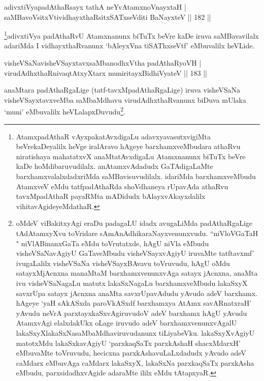 
\begin{shl}
adivxtiVyapadAthaRsayx tathA neYvA\s \s tamxnoV\s nayxtaH |\\
saMBavoV\s sitxVtividhayxthaRsitxSATxseVditi BaNayxteV \hfill || 182 ||
\end{shl}

\begin{artha}
\footnote[2]{AtamxpadAthaR vAyxpakatAvxdigaLu adavxyavasutxvigiMta beVrekaDeyalilx heVge iralAravo hAgeye barxhamxveMbudara athaRvu niratishaya mahatatxvX anaMtatAvxdigaLu Atamxnanunx biTuTx beVre kaDe hoMdibaruvudilalx. anAtamxvAdadudx GaTAdigaLaMte barxhamxvalalxdadxriMda saMBavisuvudilalx. idariMda barxhamxveMbudu  AtamxveV eMdu tatfpadAthaRda shoVdhaneya rUpavAda athaRvu tavxMpadAthaR payaRMta mADidudx bAlayxvAkayxdalilx vihitavAgideyeMdathaR.}adivxtiVya padAthaRvU Atamxnanunx biTuTx beVre kaDe iruva saMBavavilalx adariMda I vidhayxthaRvanunx `bAleyxVna tiSAThxseVtf' eMbuvalilx heVLide.
\end{artha}


\begin{shl}
visheVSaNavisheVSayxtavxsaMbanodhxV\s tha padAthaRyoVH |\\
virudAdhxthaRnivaqtAtxyX\s tarx muniritayxBidhiVyateV \hfill || 183 ||
\end{shl}

\begin{artha}
anaMtara padAthaRgaLige (tatf-tavxMpadAthaRgaLige) iruva visheVSaNa visheVSayxtavxveMba saMbaMdhavu virudAdhxthaRvanunx biDuva mUlaka `muni' eMbuvalilx heVLalapxDuvudu\footnote[1]{oMdeV viBakitxyAgi eraDu padagaLU idadx avugaLiMda padAthaRgaLige tAdAtamxyXvu toVridare sAmAnAdhikaraNayxvenunxvudu. ``niVloVGaTaH " niVlABinanxGaTa eMdu toVrutatxde, hAgU niVla eMbudu visheVSaNavAgiyU GaTaveMbudu visheVSayxvAgiyU iruvaMte tatftavxmf' ivugaLalilx visheVSaNa visheVSayxBAvavu toVruvudu, hAgU oMdu satayxMjAcnxna manaMtaM barxhamxvenunxvAga satayx jAcnxna, anaMta ivu visheVSaNagaLu matutx lakaSxNagaLu barxhamxveMbudu lakaSxyX savxrUpa satayx jAcnxna anaMta savxrUpavAdudu yAvudo adeV barxhamx. hAgeye `yaH sAkASxda paroVkASxdf barxhamxya AtAmx savARnatxraH' yAvudu neVrA parxtayxkaSxvAgiruvudoV adeV barxhamx hAgU yAvudu AtamxvAgi elalxdakUkx oLage iruvudo adeV barxhamxvenunxvAgalU lakaSxyXlakaSxNasaMbaMdhaviruvudanunx tiLiyabeVku. lakaSxyXvAgiyU matotxMdu lakaSxkavAgiyU `parxkaqSaTx parxkAshaH shacxMdarxH' eMbuvaMte toVruvudu, hecicxna parxkAshavuLaLxdadudx yAvudo adeV caMdarx eMbuvAga caMdarx lakaSxyX, lakaSxNa parxkaqSaTx parxkAsha eMbudu, parxsidadhxvAgide adaraMte ililx eMdu tAtapxyaR.}.
\end{artha}

